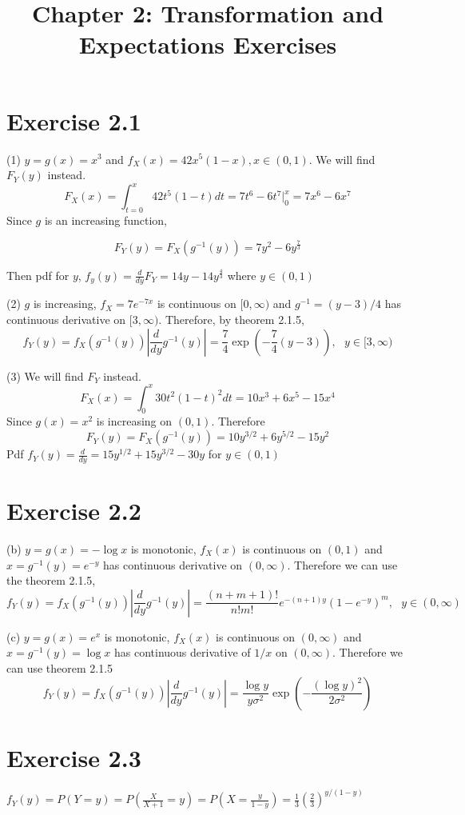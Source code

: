 \documentclass[12pt]{article}
\title{Chapter 2: Transformation and Expectations Exercises}
\begin{document}
\maketitle

\section*{Exercise 2.1}
(1) $y=g(x)=x^3$ and $f_X(x) = 42x^5(1-x), x\in(0,1)$. We will find $F_Y(y)$ instead.  
$$ F_X(x) = \int^{x}_{t=0} 42t^5(1-t) dt = 7t^6 - 6t^7 |^{x}_{0} = 7x^6-6x^7$$
Since $g$ is an increasing function, 

$$ F_Y(y) = F_X(g^{-1}(y)) = 7y^2 - 6 y^{\frac{7}{3}}$$

Then pdf for $y$,  $f_y(y) = \frac{d}{dy}F_Y = 14y - 14y^{\frac{4}{3}}$ where $y \in(0,1)$


(2) $g$ is increasing, $f_X = 7e^{-7x}$ is continuous on $[0, \infty)$ and $g^{-1} = (y-3)/4$ has continuous derivative on $[3, \infty)$. Therefore, by theorem 2.1.5, 
$$ f_Y(y) = f_X(g^{-1}(y))\left|\frac{d}{dy}g^{-1}(y)\right| = \frac{7}{4}\exp(-\frac{7}{4}(y-3)), \ \ \ y\in[3,\infty) $$

(3) We will find $F_Y$ instead.
$$ F_X(x) = \int^x_0 30t^2(1-t)^2dt  = 10x^3+6x^5-15x^4$$
Since $g(x) = x^2$ is increasing on $(0,1)$. Therefore
$$ F_Y(y) = F_X(g^{-1}(y)) = 10 y^{3/2} + 6y^{5/2} - 15y^2$$
Pdf $f_Y(y) = \frac{d}{dy} = 15y^{1/2} + 15y^{3/2} - 30y$ for $y\in (0,1)$

\section*{Exercise 2.2}
(b) $y=g(x)=-\log{x}$ is monotonic, $f_X(x)$ is continuous on $(0,1)$ and $x=g^{-1}(y) = e^{-y}$ has continuous derivative on $(0, \infty)$. Therefore we can use the theorem 2.1.5,
$$ f_Y(y) = f_X(g^{-1}(y))\left|\frac{d}{dy}g^{-1}(y) \right| = \frac{(n+m+1)!}{n!m!}e^{-(n+1)y}(1-e^{-y})^m, \ \ \ y\in (0, \infty)$$

(c) $y=g(x)=e^x$ is monotonic, $f_X(x)$ is continuous on $(0,\infty)$ and $x=g^{-1}(y) = \log{x}$ has continuous derivative of $1/x$ on $(0, \infty)$. Therefore we can use theorem 2.1.5
$$  f_Y(y) = f_X(g^{-1}(y))\left|\frac{d}{dy}g^{-1}(y) \right| = \frac{\log{y}}{y\sigma^2}\exp\left(-\frac{(\log{y})^2}{2\sigma^2}\right)$$

\section*{Exercise 2.3}
$f_Y(y) = P(Y = y) = P(\frac{X}{X+1} = y) = P(X = \frac{y}{1-y}) = \frac{1}{3}\left(\frac{2}{3}\right)^{y/(1-y)}$
\end{document}
